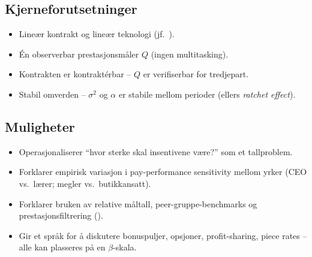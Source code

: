 \subsection*{Kjerneforutsetninger}
\begin{itemize}\setlength{\itemsep}{1pt}
\item Lineær kontrakt og lineær teknologi (jf.\ ).
\item Én observerbar prestasjonsmåler $Q$ (ingen multitasking).
\item Kontrakten er kontraktérbar -- $Q$ er verifiserbar for tredjepart.
\item Stabil omverden -- $\sigma^{2}$ og $\alpha$ er stabile mellom perioder (ellers \emph{ratchet effect}).
\end{itemize}

\subsection*{Muligheter}
\begin{itemize}\setlength{\itemsep}{1pt}
\item Operasjonaliserer ``hvor sterke skal insentivene være?'' som et tallproblem.
\item Forklarer empirisk variasjon i pay-performance sensitivity mellom yrker (CEO vs.\ lærer; megler vs.\ butikkansatt).
\item Forklarer bruken av relative måltall, peer-gruppe-benchmarks og prestasjonsfiltrering ().
\item Gir et språk for å diskutere bonuspuljer, opsjoner, profit-sharing, piece rates -- alle kan plasseres på en $\beta$-skala.
\end{itemize}

